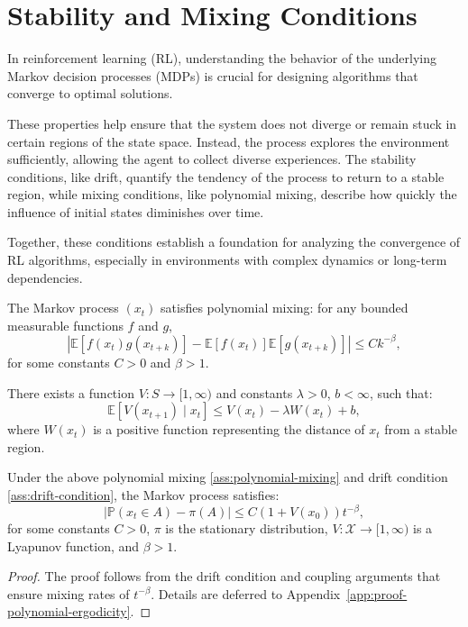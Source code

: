 \section{Stability and Mixing Conditions}
In reinforcement learning (RL), understanding the behavior of the underlying Markov decision processes (MDPs) is crucial for designing algorithms that converge to optimal solutions.

These properties help ensure that the system does not diverge or remain stuck in certain regions of the state space.
Instead, the process explores the environment sufficiently, allowing the agent to collect diverse experiences.
The stability conditions, like drift, quantify the tendency of the process to return to a stable region, while mixing conditions, like polynomial mixing, describe how quickly the influence of initial states diminishes over time.

Together, these conditions establish a foundation for analyzing the convergence of RL algorithms, especially in environments with complex dynamics or long-term dependencies.

\vspace{1em}
\begin{assumption}
\label{ass:polynomial-mixing}
The Markov process \((x_t)\) satisfies polynomial mixing: for any bounded measurable functions \(f\) and \(g\),
\[
|\mathbb{E}[f(x_t)g(x_{t+k})] - \mathbb{E}[f(x_t)]\mathbb{E}[g(x_{t+k})]| \leq C k^{-\beta},
\]
for some constants \(C > 0\) and \(\beta > 1\).
\end{assumption}
\vspace{1em}
\begin{assumption}
\label{ass:drift-condition}
There exists a function \(V: S \to [1, \infty)\) and constants \(\lambda > 0\), \(b < \infty\), such that:
\[
\mathbb{E}[V(x_{t+1}) \mid x_t] \leq V(x_t) - \lambda W(x_t) + b,
\]
where \(W(x_t)\) is a positive function representing the distance of \(x_t\) from a stable region.
\end{assumption}
\vspace{1em}
\begin{lemma}
\label{theorem:polynomial-ergodicity}
Under the above polynomial mixing \ref{ass:polynomial-mixing} and drift condition \ref{ass:drift-condition}, the Markov process satisfies:
\[
|\mathbb{P}(x_t \in A) - \pi(A)| \leq C (1 + V(x_0)) t^{-\beta},
\]
for some constants \(C > 0\), \(\pi\) is the stationary distribution,
 \( V: \mathcal{X} \to [1,\infty) \) is a Lyapunov function, and \( \beta > 1 \).
\end{lemma}

\begin{proof}
The proof follows from the drift condition and coupling arguments that ensure mixing rates of \(t^{-\beta}\). Details are deferred to Appendix~\ref{app:proof-polynomial-ergodicity}.
\end{proof}